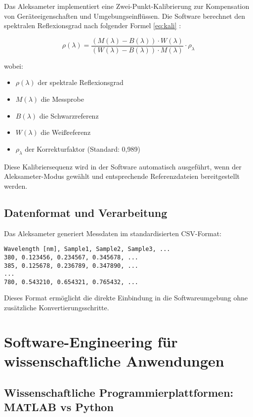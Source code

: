 Das Aleksameter implementiert eine Zwei-Punkt-Kalibrierung zur Kompensation von Geräteeigenschaften und Umgebungseinflüssen. Die Software berechnet den spektralen Reflexionsgrad nach folgender Formel \ref{eq:kali} \parencite{DIN5036-3, Hentschel2002, Baer2020, Piotrowska2022}:

\begin{equation}
    \rho(\lambda) = \frac{(M(\lambda) - B(\lambda)) \cdot W(\lambda)}{(W(\lambda) - B(\lambda)) \cdot M(\lambda)} \cdot \rho_{\lambda}
    \label{eq:aleksameter_kalibrierung}
\end{equation}

wobei:
\begin{itemize}
    \item $\rho(\lambda)$ der spektrale Reflexionsgrad
    \item $M(\lambda)$ die Messprobe
    \item $B(\lambda)$ die Schwarzreferenz  
    \item $W(\lambda)$ die Weißreferenz
    \item $\rho_{\lambda}$ der Korrekturfaktor (Standard: 0,989)
\end{itemize}

Diese Kalibriersequenz wird in der Software automatisch ausgeführt, wenn der Aleksameter-Modus gewählt und entsprechende Referenzdateien bereitgestellt werden.

\subsection{Datenformat und Verarbeitung}

Das Aleksameter generiert Messdaten im standardisierten CSV-Format:

\begin{verbatim}
Wavelength [nm], Sample1, Sample2, Sample3, ...
380, 0.123456, 0.234567, 0.345678, ...
385, 0.125678, 0.236789, 0.347890, ...
...
780, 0.543210, 0.654321, 0.765432, ...
\end{verbatim}

Dieses Format ermöglicht die direkte Einbindung in die Softwareumgebung ohne zusätzliche Konvertierungsschritte.
\section{Software-Engineering für wissenschaftliche Anwendungen}
\label{sec:software_engineering}

\subsection{Wissenschaftliche Programmierplattformen: MATLAB vs Python}


